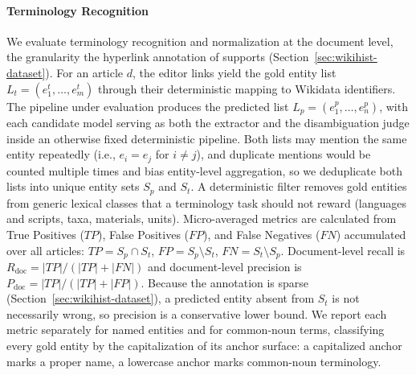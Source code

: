 \paragraph{Terminology Recognition}
We evaluate terminology recognition and normalization at the document
level, the granularity the hyperlink annotation of \datasetWikipediaName{}
supports (Section~\ref{sec:wikihist-dataset}). For an article $d$, the
editor links yield the gold entity list $L_t = (e^t_1, \dots, e^t_m)$
through their deterministic mapping to Wikidata identifiers. The pipeline
under evaluation produces the predicted list $L_p = (e^p_1, \dots, e^p_n)$,
with each candidate model serving as both the extractor and the
disambiguation judge inside an otherwise fixed deterministic pipeline.
Both lists may mention the same entity repeatedly (i.e., $e_i = e_j$ for
$i \neq j$), and duplicate mentions would be counted multiple times and
bias entity-level aggregation, so we deduplicate both lists into unique
entity sets $S_p$ and $S_t$. A deterministic filter removes gold entities
from generic lexical classes that a terminology task should not reward
(languages and scripts, taxa, materials, units). Micro-averaged metrics
are calculated from True Positives ($TP$), False Positives ($FP$), and
False Negatives ($FN$) accumulated over all articles: $TP = S_p \cap S_t$,
$FP = S_p \setminus S_t$, $FN = S_t \setminus S_p$. Document-level recall
is $R_{\mathrm{doc}} = |TP| / (|TP| + |FN|)$ and document-level precision
is $P_{\mathrm{doc}} = |TP| / (|TP| + |FP|)$. Because the annotation is
sparse (Section~\ref{sec:wikihist-dataset}), a predicted entity absent
from $S_t$ is not necessarily wrong, so precision is a conservative lower
bound. We report each metric separately for named entities and for
common-noun terms, classifying every gold entity by the capitalization of
its anchor surface: a capitalized anchor marks a proper name, a lowercase
anchor marks common-noun terminology.


